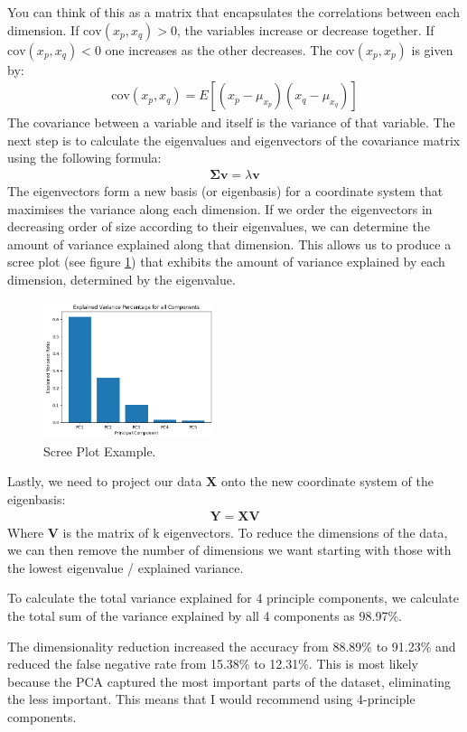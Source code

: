 \documentclass{article}
\newcommand{\matrx}[1]{\bm{#1}}
\begin{document}
	You can think of this as a matrix that encapsulates the correlations between each dimension. If $ \mathrm{cov}(x_p, x_q) > 0 $, the variables increase or decrease together. If $ \mathrm{cov}(x_p, x_q) < 0 $ one increases as the other decreases.  The $ \mathrm{cov}(x_p, x_p) $ is given by:
	\begin{align}
		\mathrm{cov}(x_p, x_q) = E[(x_p - \mu_{x_p})(x_q - \mu_{x_q})]
	\end{align}
	The covariance between a variable and itself is the variance of that variable. The next step is to calculate the eigenvalues and eigenvectors of the covariance matrix using the following formula:
	\begin{align}
		\mathbf{\Sigma}\mathbf{v} = \lambda\mathbf{v}
	\end{align}
	The eigenvectors form a new basis (or eigenbasis) for a coordinate system that maximises the variance along each dimension. If we order the eigenvectors in decreasing order of size according to their eigenvalues, we can determine the amount of variance explained along that dimension. This allows us to produce a scree plot (see figure \ref{fig:screen_plot}) that exhibits the amount of variance explained by each dimension, determined by the eigenvalue.
	\begin{figure}
		\centering
		\includegraphics*[width = 5cm]{scree_plot_example.png}
		\caption{Scree Plot Example.}
		\label{fig:screen_plot}
	\end{figure}
	Lastly, we need to project our data $ \matrx{X} $ onto the new coordinate system of the eigenbasis:
	\begin{align}
		\matrx{Y} = \matrx{X}\matrx{V}
	\end{align}
	Where $ \matrx{V} $ is the matrix of k eigenvectors. To reduce the dimensions of the data, we can then remove the number of dimensions we want starting with those with the lowest eigenvalue / explained variance.
	
	To calculate the total variance explained for 4 principle components, we calculate the total sum of the variance explained by all 4 components as 98.97\%.
	
	The dimensionality reduction increased the accuracy from 88.89\% to 91.23\% and reduced the false negative rate from 15.38\% to 12.31\%. This is most likely because the PCA captured the most important parts of the dataset, eliminating the less important. This means that I would recommend using 4-principle components. 
\end{document}
